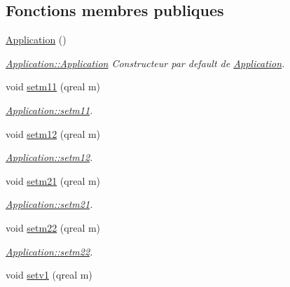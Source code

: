 \subsection*{Fonctions membres publiques}
\begin{DoxyCompactItemize}
\item 
\hypertarget{class_application_afa8cc05ce6b6092be5ecdfdae44e05f8}{}\hyperlink{class_application_afa8cc05ce6b6092be5ecdfdae44e05f8}{Application} ()\label{class_application_afa8cc05ce6b6092be5ecdfdae44e05f8}

\begin{DoxyCompactList}\small\item\em \hyperlink{class_application_afa8cc05ce6b6092be5ecdfdae44e05f8}{Application\+::\+Application} Constructeur par default de \hyperlink{class_application}{Application}. \end{DoxyCompactList}\item 
void \hyperlink{class_application_a6497226f03c582468906c2752fb3e604}{setm11} (qreal m)
\begin{DoxyCompactList}\small\item\em \hyperlink{class_application_a6497226f03c582468906c2752fb3e604}{Application\+::setm11}. \end{DoxyCompactList}\item 
void \hyperlink{class_application_abf90c1d5903aa1ae2d4bfb05922f5742}{setm12} (qreal m)
\begin{DoxyCompactList}\small\item\em \hyperlink{class_application_abf90c1d5903aa1ae2d4bfb05922f5742}{Application\+::setm12}. \end{DoxyCompactList}\item 
void \hyperlink{class_application_a9aed2c898106e2f7bb32c115860415d1}{setm21} (qreal m)
\begin{DoxyCompactList}\small\item\em \hyperlink{class_application_a9aed2c898106e2f7bb32c115860415d1}{Application\+::setm21}. \end{DoxyCompactList}\item 
void \hyperlink{class_application_a32c06028e2ad3396d49fec90db0e51ac}{setm22} (qreal m)
\begin{DoxyCompactList}\small\item\em \hyperlink{class_application_a32c06028e2ad3396d49fec90db0e51ac}{Application\+::setm22}. \end{DoxyCompactList}\item 
void \hyperlink{class_application_a71f187ec6cbb5be46a9c56c8997b7295}{setv1} (qreal m)

\end{DoxyCompactItemize}

